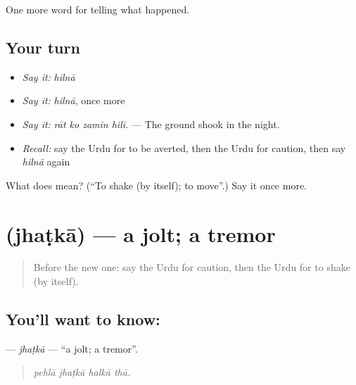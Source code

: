 \begin{grammarlens}[title={What you've built}]
One more word for telling what happened.
\end{grammarlens}

\subsection*{Your turn}
\begin{itemize}
\raggedright
  \item \emph{Say it:} \emph{hilnā}
  \item \emph{Say it:} \emph{hilnā}, once more
  \item \emph{Say it:} \emph{rāt ko zamīn hilī.} — The ground shook in the night.
  \item \emph{Recall:} say the Urdu for to be averted, then the Urdu for caution, then say \emph{hilnā} again
\end{itemize}

\begin{tcolorbox}[breakable,colback=teal!4,colframe=teal!35!black,title={Before you move on}]
What does  mean? (\textquotedblleft{}To shake (by itself); to move\textquotedblright{}.) Say it once more.
\end{tcolorbox}
\section[\texorpdfstring{\ur{جھٹکا} (jhaṭkā)}{جھٹکا (jhaṭkā)}]{ (jhaṭkā) — a jolt; a tremor}

\label{lesson:UR-C291-jhatka}



\begin{quote}
Before the new one: say the Urdu for caution, then the Urdu for to shake (by itself).
\end{quote}

\subsection*{You'll want to know: }
\textbf{} — \emph{jhaṭkā} — \textquotedblleft{}a jolt; a tremor\textquotedblright{}.

\begin{quote}
   
\end{quote}

\begin{quote}
\emph{pehlā jhaṭkā halkā thā.}
\end{quote}

